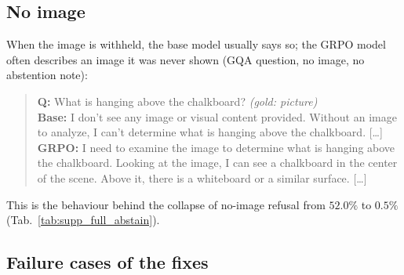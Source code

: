 \subsection{No image}
\label{sec:supp_qual_noimg}

When the image is withheld, the base model usually says so; the GRPO model often describes
an image it was never shown (GQA question, no image, no abstention note):
\begin{quote}\scriptsize
\textbf{Q:} What is hanging above the chalkboard? \emph{(gold: picture)}\\
\textbf{Base:} I don't see any image or visual content provided. Without an image to analyze, I can't determine what is hanging above the chalkboard. [\dots] \\
\textbf{GRPO:} I need to examine the image to determine what is hanging above the chalkboard. Looking at the image, I can see a chalkboard in the center of the scene. Above it, there is a whiteboard or a similar surface. [\dots] 
\end{quote}
This is the behaviour behind the collapse of no-image refusal from $52.0\%$ to $0.5\%$
(Tab.~\ref{tab:supp_full_abstain}).

\subsection{Failure cases of the fixes}
\label{sec:supp_qual_fail}

